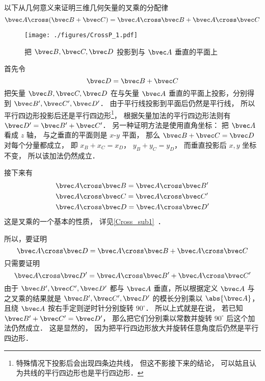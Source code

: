 
以下从几何意义来证明三维几何矢量的叉乘的分配律
\begin{equation}
\bvec A \cross (\bvec B + \bvec C) = \bvec A \cross \bvec B + \bvec A \cross \bvec C
\end{equation}

\begin{figure}[ht]
\vskip-10pt
\centering
\texttt{[image: ./figures/CrossP\_1.pdf]}
\caption{把 $\bvec B,\bvec C,\bvec D$ 投影到与 $\bvec A$ 垂直的平面上}
\end{figure}

首先令
\begin{equation}
\bvec D = \bvec B + \bvec C
\end{equation}
把矢量 $\bvec B,\bvec C,\bvec D$ 在与矢量 $\bvec A$ 垂直的平面上投影，分别得到 $\bvec B',\bvec C',\bvec D'$． 由于平行线投影到平面后仍然是平行线， 所以平行四边形投影后还是平行四边形\footnote{特殊情况下投影后会出现四条边共线， 但这不影接下来的结论， 可以姑且认为共线的平行四边形也是平行四边形．}， 根据矢量加法的平行四边形法则有 $\bvec D'=\bvec B'+\bvec C'$． 另一种证明方法是使用直角坐标： 把 $\bvec A$ 看成 $z$ 轴， 与之垂直的平面则是 $x$-$y$ 平面， 那么 $\bvec B + \bvec C = \bvec D$ 对每个分量都成立， 即 $x_B + x_C = x_D$， $y_B + y_C = y_D$， 而垂直投影后 $x,y$ 坐标不变， 所以该加法仍然成立．

接下来有
\begin{equation}\label{CrossP_eq2}
\begin{aligned}
&\bvec A \cross \bvec B = \bvec A \cross \bvec B'\\
&\bvec A \cross \bvec C = \bvec A \cross \bvec C'\\
&\bvec A \cross \bvec D = \bvec A \cross \bvec D'
\end{aligned}
\end{equation} 
这是叉乘的一个基本的性质， 详见\autoref{Cross_sub1}~．

所以，要证明
\begin{equation}\label{CrossP_eq1}
\bvec A \cross \bvec D = \bvec A \cross \bvec B + \bvec A \cross \bvec C
\end{equation}
只需要证明
\begin{equation}
\bvec A \cross \bvec D' = \bvec A \cross \bvec B' + \bvec A \cross \bvec C'
\end{equation}
由于 $\bvec B', \bvec C', \bvec D'$ 都与 $\bvec A$ 垂直，所以根据定义 $\bvec A$ 与之叉乘的结果就是 $\bvec B', \bvec C', \bvec D'$ 的模长分别乘以 $\abs {\bvec A}$， 且绕 $\bvec A$ 按右手定则逆时针分别旋转 $90^\circ$． 所以上式就是在说， 若已知 $\bvec B' + \bvec C' = \bvec D'$， 那么把它们分别乘以常数并旋转 $90^\circ$ 后这个加法仍然成立． 这是显然的， 因为把平行四边形放大并旋转任意角度后仍然是平行四边形．

